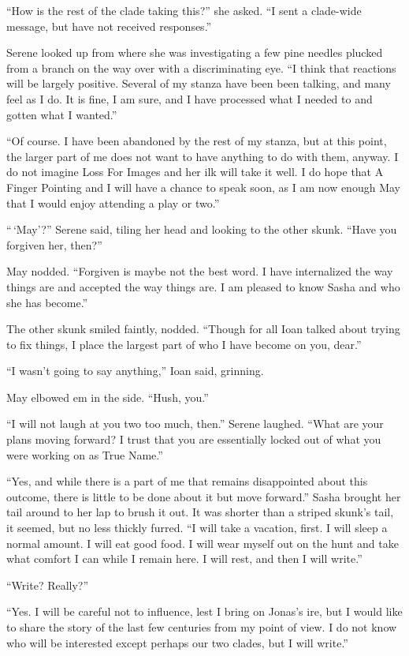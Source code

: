 ``How is the rest of the clade taking this?'' she asked. ``I sent a clade-wide message, but have not received responses.''

Serene looked up from where she was investigating a few pine needles plucked from a branch on the way over with a discriminating eye. ``I think that reactions will be largely positive. Several of my stanza have been been talking, and many feel as I do. It is fine, I am sure, and I have processed what I needed to and gotten what I wanted.''

``Of course. I have been abandoned by the rest of my stanza, but at this point, the larger part of me does not want to have anything to do with them, anyway. I do not imagine Loss For Images and her ilk will take it well. I do hope that A Finger Pointing and I will have a chance to speak soon, as I am now enough May that I would enjoy attending a play or two.''

``\,`May'?'' Serene said, tiling her head and looking to the other skunk. ``Have you forgiven her, then?''

May nodded. ``Forgiven is maybe not the best word. I have internalized the way things are and accepted the way things are. I am pleased to know Sasha and who she has become.''

The other skunk smiled faintly, nodded. ``Though for all Ioan talked about trying to fix things, I place the largest part of who I have become on you, dear.''

``I wasn't going to say anything,'' Ioan said, grinning.

May elbowed em in the side. ``Hush, you.''

``I will not laugh at you two too much, then.'' Serene laughed. ``What are your plans moving forward? I trust that you are essentially locked out of what you were working on as True Name.''

``Yes, and while there is a part of me that remains disappointed about this outcome, there is little to be done about it but move forward.'' Sasha brought her tail around to her lap to brush it out. It was shorter than a striped skunk's tail, it seemed, but no less thickly furred. ``I will take a vacation, first. I will sleep a normal amount. I will eat good food. I will wear myself out on the hunt and take what comfort I can while I remain here. I will rest, and then I will write.''

``Write? Really?''

``Yes. I will be careful not to influence, lest I bring on Jonas's ire, but I would like to share the story of the last few centuries from my point of view. I do not know who will be interested except perhaps our two clades, but I will write.''

